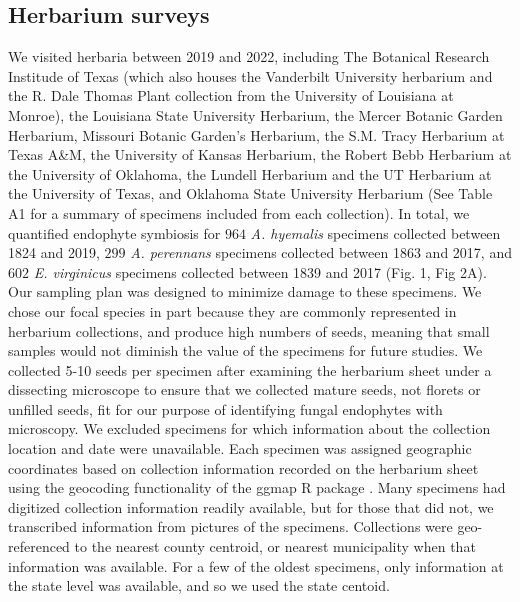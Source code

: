 \documentclass[11pt]{article}
\begin{document}
		\subsection*{Herbarium surveys}
We visited herbaria between 2019 and 2022, including The Botanical Research Institude of Texas (which also houses the Vanderbilt University herbarium and the R. Dale Thomas Plant collection from the University of Louisiana at Monroe), the Louisiana State University Herbarium, the Mercer Botanic Garden Herbarium, Missouri Botanic Garden's Herbarium, the S.M. Tracy Herbarium at Texas A\&M, the University of Kansas Herbarium, the Robert Bebb Herbarium at the University of Oklahoma, the Lundell Herbarium and the UT Herbarium at the University of Texas, and Oklahoma State University Herbarium (See Table A1 for a summary of specimens included from each collection). 
In total, we quantified endophyte symbiosis for $964$ \emph{A. hyemalis} specimens collected between 1824 and 2019, $299$ \emph{A. perennans} specimens collected between 1863 and 2017, and $602$ \emph{E. virginicus} specimens collected between 1839 and 2017 (Fig. 1, Fig 2A).
Our sampling plan was designed to minimize damage to these specimens.
We chose our focal species in part because they are commonly represented in herbarium collections, and produce high numbers of seeds, meaning that small samples would not diminish the value of the specimens for future studies. 
We collected 5-10 seeds per specimen after examining the herbarium sheet under a dissecting microscope to ensure that we collected mature seeds, not florets or unfilled seeds, fit for our purpose of identifying fungal endophytes with microscopy.
We excluded specimens for which information about the collection location and date were unavailable.
Each specimen was assigned geographic coordinates based on collection information recorded on the herbarium sheet using the geocoding functionality of the ggmap R package \citep{kahle2019package}.
Many specimens had digitized collection information readily available, but for those that did not, we transcribed information from pictures of the specimens. 
Collections were geo-referenced to the nearest county centroid, or nearest municipality when that information was available. 
For a few of the oldest specimens, only information at the state level was available, and so we used the state centoid.
\end{document}
